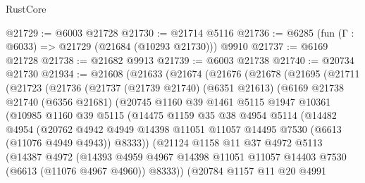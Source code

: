\begin{lexlean}{RustCore}
\begin{coremodule}
@21729 := @6003 @21728
@21730 := @21714 @5116
@21736 := @6285 (fun (Γ : @6033) => @21729 (@21684 (@10293 @21730))) @9910
@21737 := @6169 @21728
@21738 := @21682 @9913
@21739 := @6003 @21738
@21740 := @20734 @21730
@21934 := @21608
    (@21633
      (@21674
        (@21676
          (@21678
            (@21695
              (@21711
                (@21723
                  (@21736
                    (@21737
                      (@21739 @21740)
                      (@6351 @21613)
                      (@6169
                        @21738
                        @21740
                        (@6356 @21681)
                        (@20745
                          @1160
                          @39
                          @1461
                          @5115
                          @1947
                          @10361
                          (@10985
                            @1160
                            @39
                            @5115
                            (@14475
                              @1159
                              @35
                              @38
                              @4954
                              @5114
                              (@14482
                                @4954
                                (@20762
                                  @4942
                                  @4949
                                  @14398
                                  @11051
                                  @11057
                                  @14495
                                  @7530
                                  (@6613 (@11076 @4949 @4943))
                                  @8333))
                              (@21124
                                @1158
                                @11
                                @37
                                @4972
                                @5113
                                (@14387
                                  @4972
                                  (@14393
                                    @4959
                                    @4967
                                    @14398
                                    @11051
                                    @11057
                                    @14403
                                    @7530
                                    (@6613 (@11076 @4967 @4960))
                                    @8333))
                                (@20784
                                  @1157
                                  @11
                                  @20
                                  @4991

\end{coremodule}
\end{lexlean}
